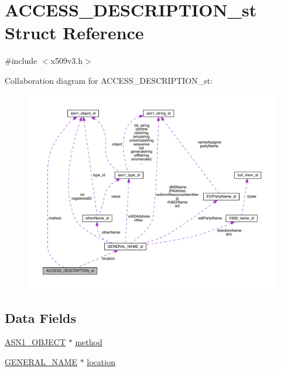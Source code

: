 \hypertarget{struct_a_c_c_e_s_s___d_e_s_c_r_i_p_t_i_o_n__st}{}\section{A\+C\+C\+E\+S\+S\+\_\+\+D\+E\+S\+C\+R\+I\+P\+T\+I\+O\+N\+\_\+st Struct Reference}
\label{struct_a_c_c_e_s_s___d_e_s_c_r_i_p_t_i_o_n__st}


{\ttfamily \#include $<$x509v3.\+h$>$}



Collaboration diagram for A\+C\+C\+E\+S\+S\+\_\+\+D\+E\+S\+C\+R\+I\+P\+T\+I\+O\+N\+\_\+st\+:\nopagebreak
\begin{figure}[H]
\begin{center}
\leavevmode
\includegraphics[width=350pt]{struct_a_c_c_e_s_s___d_e_s_c_r_i_p_t_i_o_n__st__coll__graph}
\end{center}
\end{figure}
\subsection*{Data Fields}
\begin{DoxyCompactItemize}
\item 
\hyperlink{crypto_2ossl__typ_8h_ae3fda0801e4c8e250087052bafb3ce2e}{A\+S\+N1\+\_\+\+O\+B\+J\+E\+CT} $\ast$ \hyperlink{struct_a_c_c_e_s_s___d_e_s_c_r_i_p_t_i_o_n__st_a36cd19c137879012c23b76ea66bf8ba0}{method}
\item 
\hyperlink{crypto_2x509v3_2x509v3_8h_a6688fb8a0c7b8e63f3d47bac3a09eb15}{G\+E\+N\+E\+R\+A\+L\+\_\+\+N\+A\+ME} $\ast$ \hyperlink{struct_a_c_c_e_s_s___d_e_s_c_r_i_p_t_i_o_n__st_add8b55cb4d43ec454401e05f26753726}{location}
\end{DoxyCompactItemize}


